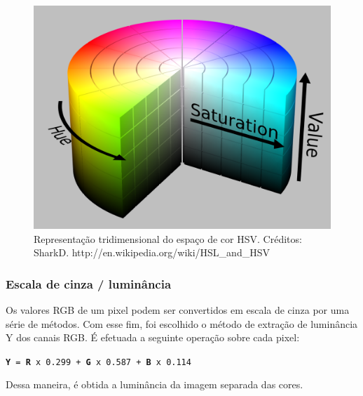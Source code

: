 \documentclass[12pt]{article}
\begin{document}
	\begin{figure}[ht!]
	\begin{center}
		\includegraphics[scale=0.12]{img/HSV_color_solid_cylinder_alpha_lowgamma.png}
		\footnotesize \caption{Representa\c c\~ao tridimensional do espa\c co de cor HSV. Cr\'editos: SharkD. http://en.wikipedia.org/wiki/HSL\_and\_HSV }
	\end{center}
	\end{figure}	

\subsubsection{Escala de cinza / lumin\^ancia}
Os valores RGB de um pixel podem ser convertidos em escala de cinza por uma s\'erie de m\'etodos.
Com esse fim, foi escolhido o m\'etodo de extra\c c\~ao de lumin\^ancia Y dos canais RGB.
\'E efetuada a seguinte opera\c c\~ao sobre cada pixel:

\texttt{\small \textbf{Y} = \textbf{R} x 0.299 + \textbf{G} x 0.587 + \textbf{B} x 0.114}

\noindent Dessa maneira, \'e obtida a lumin\^ancia da imagem separada das cores.
\end{document}
